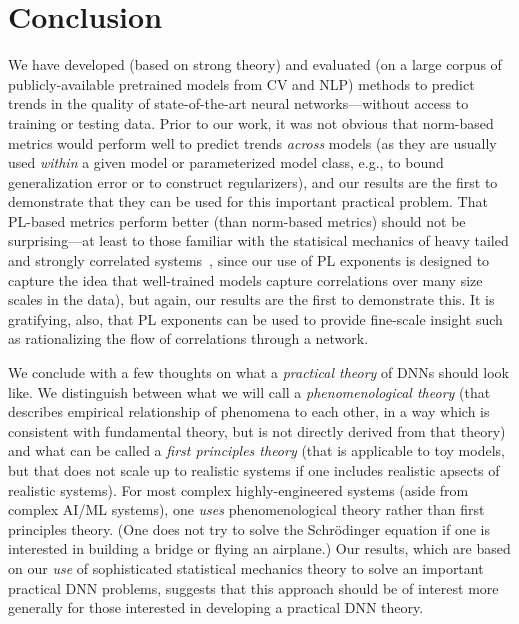 \section{Conclusion}
\label{sxn:conc}

We have developed (based on strong theory) and evaluated (on a large corpus of publicly-available pretrained models from CV and NLP) methods to predict trends in the quality of state-of-the-art neural networks---without access to training or testing data.
Prior to our work, it was not obvious that norm-based metrics would perform well to predict trends \emph{across} models (as they are usually used \emph{within} a given model or parameterized model class, e.g., to bound generalization error or to construct regularizers), and our results are the first to demonstrate that they can be used for this important practical problem.
That PL-based metrics perform better (than norm-based metrics) should not be surprising---at least to those familiar with the statisical mechanics of heavy tailed and strongly correlated systems~\cite{BouchaudPotters03, SornetteBook, BP11, bun2017}, since our use of PL exponents is designed to capture the idea that well-trained models capture correlations over many size scales in the data), but again,  our results are the first to demonstrate this.
It is gratifying, also, that PL exponents can be used to provide fine-scale insight such as rationalizing the flow of correlations through a network. 

We conclude with a few thoughts on what a \emph{practical theory} of DNNs should look like.
%
We distinguish between what we will call a
\emph{phenomenological theory}
(that describes empirical relationship of phenomena to each other, in a way which is consistent with fundamental theory, but is not directly derived from that theory)
and what can be called a 
\emph{first principles theory} 
(that is applicable to toy models, but that does not scale up to realistic systems if one includes realistic apsects of realistic systems).
%
For most complex highly-engineered systems (aside from complex AI/ML systems), one \emph{uses} phenomenological theory rather than first principles theory. 
(One does not try to solve the Schr\"odinger equation if one is interested in building a bridge or flying an airplane.)
%
Our results, which are based on our \emph{use} of sophisticated statistical mechanics theory to solve an important practical DNN problems, suggests that this approach should be of interest more generally for those interested in developing a practical DNN theory.


